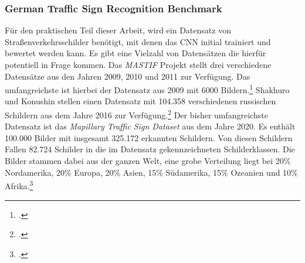 \subsubsection{German Traffic Sign Recognition Benchmark}
Für den praktischen Teil dieser Arbeit, wird ein Datensatz von Straßenverkehrsschilder benötigt, mit denen das \ac{CNN} initial trainiert und bewertet werden kann. Es gibt eine Vielzahl von Datensätzen die hierfür potentiell in Frage kommen. Das \textit{\ac{MASTIF}} Projekt stellt drei verschiedene Datensätze aus den Jahren 2009, 2010 und 2011 zur Verfügung. Das umfangreichste ist hierbei der Datensatz aus 2009 mit 6000 Bildern.\footcite[Vgl.][S. 66-73]{vsegvic2010computer} Shakhuro und Konushin stellen einen Datensatz mit 104.358 verschiedenen russischen Schildern aus dem Jahre 2016 zur Verfügung.\footcite[Vgl.][S. 294-300]{rtsd} Der bisher umfangreichste Datensatz ist das \textit{Mapillary Traffic Sign Dataset} aus dem Jahre 2020. Es enthält 100.000 Bilder mit insgesamt 325.172 erkannten Schildern. Von diesen Schildern Fallen 82.724 Schilder in die im Datensatz gekennzeichneten Schilderklassen. Die Bilder stammen dabei aus der ganzen Welt, eine grobe Verteilung liegt bei 20\% Nordamerika, 20\% Europa, 20\% Asien, 15\% Südamerika, 15\% Ozeanien und 10\% Afrika.\footcite[Vgl.][S. 1-17]{ertlerMapillaryTrafficSign2020}

